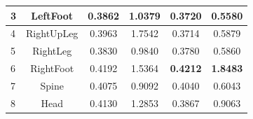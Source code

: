 \begin{table}[ht!]
{\begin{tabular}{cc|c|c|c|c|}
\multicolumn{1}{|l|}{3}                                                       & LeftFoot                                              & 0.3862                                                           & 1.0379                                                        & 0.3720                                                          & 0.5580                                                        \\ \hline
\multicolumn{1}{|l|}{4}                                                       & RightUpLeg                                            & 0.3963                                                           & 1.7542                                                        & 0.3714                                                          & 0.5879                                                        \\ \hline
\multicolumn{1}{|l|}{5}                                                       & RightLeg                                              & 0.3830                                                           & 0.9840                                                        & 0.3780                                                          & 0.5860                                                        \\ \hline
\multicolumn{1}{|l|}{6}                                                       & RightFoot                                             & 0.4192                                                           & 1.5364                                                        & \textbf{0.4212}                                                          & \textbf{1.8483}                                                        \\ \hline
\multicolumn{1}{|l|}{7}                                                       & Spine                                                 & 0.4075                                                           & 0.9092                                                        & 0.4040                                                          & 0.6043                                                        \\ \hline
\multicolumn{1}{|l|}{8}                                                       & Head                                                  & 0.4130                                                           & 1.2853                                                        & 0.3867                                                          & 0.9063                                                        \\ \hline

\end{tabular}}
\end{table}
